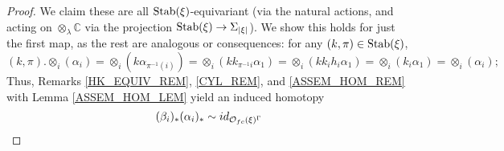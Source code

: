 \documentclass[a4paper,10pt
,draft
]{article}%
\renewcommand{\1}{\ensuremath{\mathbb{id}}}
\begin{document}
\begin{proof}
      We claim these are all $\mathrm{Stab}(\xi)$-equivariant
      (via the natural actions, and acting on $\otimes_\lambda \mathbb C$ via the projection $\mathrm{Stab}(\xi) \to \Sigma_{|\xi|}$).
      We show this holds for just the first map, as the rest are analogous or consequences:
      for any $(k,\pi) \in \mathrm{Stab}(\xi)$,
      \begin{equation}
            \label{AB_STAR_EQ}
            (k, \pi) . \otimes_i(\alpha_i)
            =
            \otimes_i (k \alpha_{\pi^{-1}(i)})
            =
            \otimes_i (k k_{\pi^{-1}i} \alpha_1)
            =
            \otimes_i (k k_i h_i \alpha_1)
            =
            \otimes_i (k_i \alpha_1)
            =
            \otimes_i (\alpha_i);
      \end{equation}
      Thus, 
      Remarks \ref{HK_EQUIV_REM}, \ref{CYL_REM}, and \ref{ASSEM_HOM_REM} with Lemma \ref{ASSEM_HOM_LEM}
      yield an induced homotopy
      \begin{equation}
            (\beta_i)_{\**}(\alpha_i)_{\**} \sim id_{\O_{f c}(\ksi)^\Gamma}

\end{equation}
\end{proof}
\end{document}
